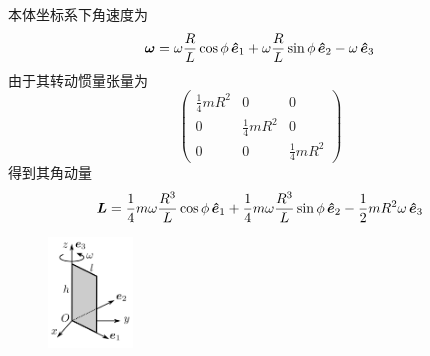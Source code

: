 \begin{solution}
    本体坐标系下角速度为
    $$\boldsymbol{\omega}=\omega\frac{R}{L}\cos\phi\,\boldsymbol{\hat{e}}_1+\omega\frac{R}{L}\sin\phi\,\boldsymbol{\hat{e}}_2-\omega\, \boldsymbol{\hat{e}}_3$$
    由于其转动惯量张量为
    $$\begin{pmatrix}
        \frac14mR^2&0&0\\0&\frac14mR^2&0\\0&0&\frac14mR^2
    \end{pmatrix}$$
    得到其角动量
    $$\boldsymbol{L}=\frac14m\omega\frac{R^3}{L}\cos\phi \,\boldsymbol{\hat{e}}_1+\frac{1}{4}m\omega\frac{R^3}{L}\sin\phi \,\boldsymbol{\hat{e}}_2-\frac12mR^2\omega\,\boldsymbol{\hat{e}}_3$$
\end{solution}
\begin{figure}[h]
    \centering
    \includegraphics[width=0.2\textwidth]{content/Figures/12-14}
    \caption{ }
    \label{fig:12-14}
\end{figure}

